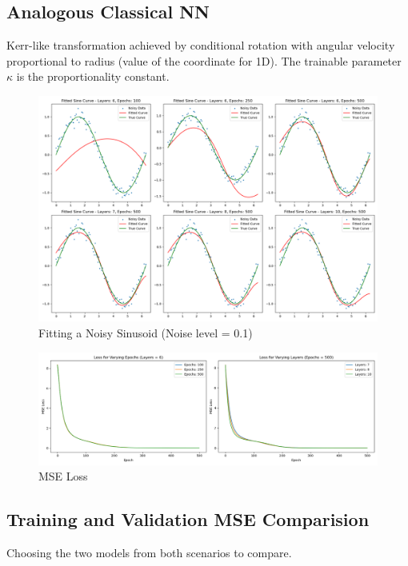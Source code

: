 \documentclass[11pt,oneside]{article}
\theoremstyle{definition}
\theoremstyle{definition}
\begin{document}
\FloatBarrier

\subsection{Analogous Classical NN}

Kerr-like transformation achieved by conditional rotation with angular velocity proportional to radius (value of the coordinate for 1D). The trainable parameter $\kappa$ is the proportionality constant.

\begin{figure}[hbt!]
    \centering
    \includegraphics[width=\textwidth]{images/fits_classical.png}
    \caption{Fitting a Noisy Sinusoid (Noise level = 0.1)}
    \label{t3}
\end{figure}

\begin{figure}[hbt!]
    \centering
    \includegraphics[width=\textwidth]{images/mses_classical.png}
    \caption{MSE Loss}
    \label{t4}
\end{figure}

\FloatBarrier

\subsection{Training and Validation MSE Comparision}
Choosing the two models from both scenarios to compare.
\end{document}

